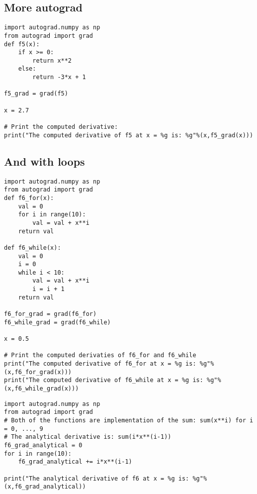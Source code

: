 \documentclass[%
oneside,                 %
final,                   %
10pt]{article}
\begin{document}
\subsection*{More autograd}

\begin{verbatim}
import autograd.numpy as np
from autograd import grad
def f5(x):
    if x >= 0:
        return x**2
    else:
        return -3*x + 1

f5_grad = grad(f5)

x = 2.7

# Print the computed derivative:
print("The computed derivative of f5 at x = %g is: %g"%(x,f5_grad(x)))
\end{verbatim}


\subsection*{And  with loops}

\begin{verbatim}
import autograd.numpy as np
from autograd import grad
def f6_for(x):
    val = 0
    for i in range(10):
        val = val + x**i
    return val

def f6_while(x):
    val = 0
    i = 0
    while i < 10:
        val = val + x**i
        i = i + 1
    return val

f6_for_grad = grad(f6_for)
f6_while_grad = grad(f6_while)

x = 0.5

# Print the computed derivaties of f6_for and f6_while
print("The computed derivative of f6_for at x = %g is: %g"%(x,f6_for_grad(x)))
print("The computed derivative of f6_while at x = %g is: %g"%(x,f6_while_grad(x)))
\end{verbatim}
\begin{verbatim}
import autograd.numpy as np
from autograd import grad
# Both of the functions are implementation of the sum: sum(x**i) for i = 0, ..., 9
# The analytical derivative is: sum(i*x**(i-1)) 
f6_grad_analytical = 0
for i in range(10):
    f6_grad_analytical += i*x**(i-1)

print("The analytical derivative of f6 at x = %g is: %g"%(x,f6_grad_analytical))
\end{verbatim}
\end{document}
